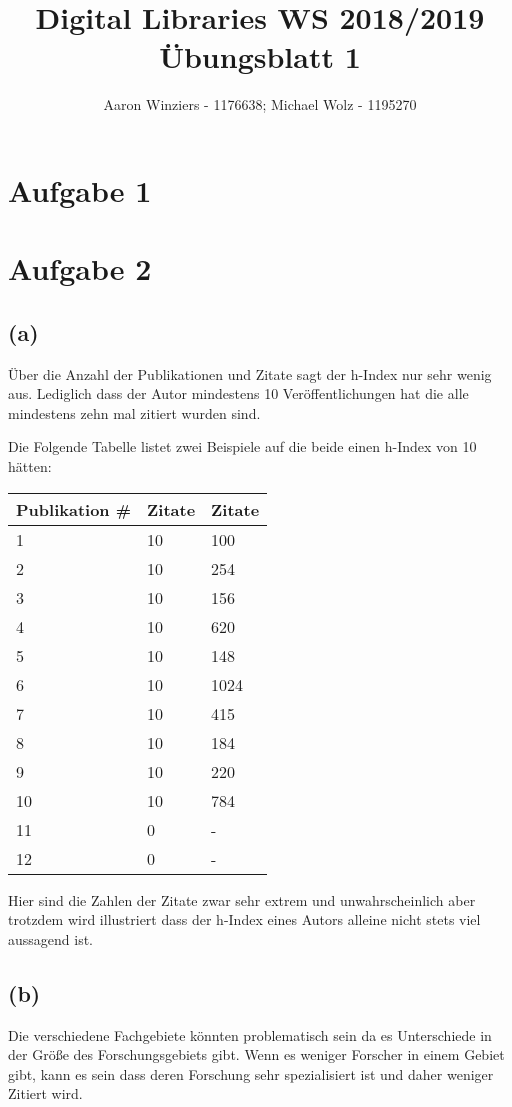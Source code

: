 \documentclass[11pt,a4paper,parskip=half ]{scrartcl}
\author{Aaron Winziers - 1176638; Michael Wolz - 1195270}
\title{Digital Libraries WS 2018/2019\\\LARGE{Übungsblatt 1}}
\begin{document}
	\maketitle
	
	\section*{Aufgabe 1}
	
	\section*{Aufgabe 2}
		\subsection*{(a)} Über die Anzahl der Publikationen und Zitate sagt der h-Index nur sehr wenig aus. Lediglich dass der Autor mindestens 10 Veröffentlichungen hat die alle mindestens zehn mal zitiert wurden sind.
		
		Die Folgende Tabelle listet zwei Beispiele auf die beide einen h-Index von 10 hätten:	\\
		\begin{tabular}{l||l|l}
			Publikation \#	& Zitate	& Zitate	\\
			\hline
			\hline
			1	& 10	& 100	\\
			2	& 10	& 254	\\
			3	& 10	& 156	\\
			4	& 10	& 620	\\
			5	& 10	& 148	\\
			6	& 10	& 1024	\\
			7	& 10	& 415	\\
			8	& 10	& 184	\\
			9	& 10	& 220	\\
			10	& 10 	& 784	\\
			11	& 0	& -	\\
			12	& 0	& -	\\
		\end{tabular}
	
		Hier sind die Zahlen der Zitate zwar sehr extrem und unwahrscheinlich aber trotzdem wird illustriert dass der h-Index eines Autors alleine nicht stets viel aussagend ist.
	
		\subsection*{(b)}
		
		Die verschiedene Fachgebiete könnten problematisch sein da es Unterschiede in der Größe des Forschungsgebiets gibt. Wenn es weniger Forscher in einem Gebiet gibt, kann es sein dass deren Forschung sehr spezialisiert ist und daher weniger Zitiert wird.
		
\end{document}
